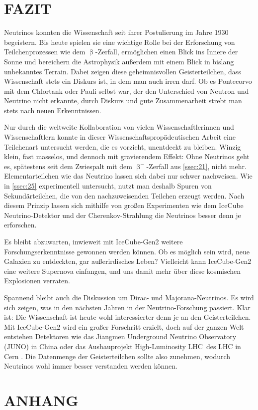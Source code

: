 \documentclass[a4paper,12pt]{article}
\begin{document}
\newpage
\section{FAZIT} \label{sec:4}

Neutrinos konnten die Wissenschaft seit ihrer Postulierung im Jahre 1930 begeistern. Bis heute spielen sie eine wichtige Rolle bei der Erforschung von Teilchenprozessen wie dem $\upbeta$-Zerfall, ermöglichen einen Blick ins Innere der Sonne und bereichern die Astrophysik außerdem mit einem Blick in bislang unbekanntes Terrain. Dabei zeigen diese geheimnisvollen Geisterteilchen, dass Wissenschaft stets ein Diskurs ist, in dem man auch irren darf. Ob es Pontecorvo mit dem Chlortank oder Pauli selbst war, der den Unterschied von Neutron und Neutrino nicht erkannte, durch Diskurs und gute Zusammenarbeit strebt man stets nach neuen Erkenntnissen. \par
Nur durch die weltweite Kollaboration von vielen Wissenschaftlerinnen und Wissenschaftlern konnte in dieser Wissenschaftspropädeutischen Arbeit eine Teilchenart untersucht werden, die es vorzieht, unentdeckt zu bleiben. Winzig klein, fast masselos, und dennoch mit gravierendem Effekt: Ohne Neutrinos geht es, spätestens seit dem Zwiespalt mit dem $\upbeta^-$-Zerfall aus \cref{ssec:21}, nicht mehr. Elementarteilchen wie das Neutrino lassen sich dabei nur schwer nachweisen. Wie in \cref{ssec:25} experimentell untersucht, nutzt man deshalb Spuren von Sekundärteilchen, die von den nachzuweisenden Teilchen erzeugt werden. Nach diesem Prinzip lassen sich mithilfe von großen Experimenten wie dem IceCube Neutrino-Detektor und der Cherenkov-Strahlung die Neutrinos besser denn je erforschen. \par 
Es bleibt abzuwarten, inwieweit mit IceCube-Gen2 weitere Forschungserkenntnisse gewonnen werden können. Ob es möglich sein wird, neue Galaxien zu entdeckten, gar außerirdisches Leben? Vielleicht kann IceCube-Gen2 eine weitere Supernova einfangen, und uns damit mehr über diese kosmischen Explosionen verraten. \par
Spannend bleibt auch die Diskussion um Dirac- und Majorana-Neutrinos. Es wird sich zeigen, was in den nächsten Jahren in der Neutrino-Forschung passiert. Klar ist: Die Wissenschaft ist heute wohl interessierter denn je an den Geisterteilchen. Mit IceCube-Gen2 wird ein großer Forschritt erzielt, doch auf der ganzen Welt entstehen Detektoren wie das Jiangmen Underground Neutrino Observatory (JUNO) in China \cite{UniJohannesGutenbergMainz2025, JUNO2025} oder das Ausbauprojekt \glqq High-Luminosity LHC\grqq \ des LHC in Cern \cite{UniBonn2025}. Die Datenmenge der Geisterteilchen sollte also zunehmen, wodurch Neutrinos wohl immer besser verstanden werden können.

\nocite{Hu2017}

\newpage

\section{ANHANG} \label{sec:5}
\printbibliography[title=Literaturverzeichnis]
\end{document}
